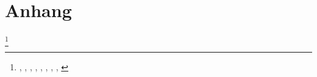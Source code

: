 \chapter{Anhang}\label{ch:experiments}

\footnote{\cite{Chatterjee2015}, \cite{Song2004}, \cite{Quadros2011}, \cite{Singh2013}, \cite{Shakir2016}, \cite{Li2012}, \cite{Benhaddou2015}, \cite{Ferrer2023}, \cite{Ali2022}}
